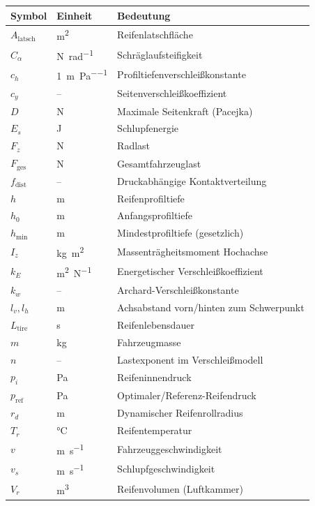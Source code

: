 ﻿\documentclass[12pt,a4paper]{article}
\theoremstyle{definition}
\theoremstyle{remark}
\newcommand{\Fz}{F_z}
\begin{document}
\begin{longtable}{lll}
\toprule
\textbf{Symbol} & \textbf{Einheit} & \textbf{Bedeutung}\\
\midrule
$A_{\mathrm{latsch}}$ & \si{\metre\squared} & Reifenlatschfläche\\
$C_\alpha$ & \si{\newton\per\radian} & Schräglaufsteifigkeit\\
$c_h$ & \si{1\per\metre\per\pascal} & Profiltiefenverschleißkonstante\\
$c_y$ & -- & Seitenverschleißkoeffizient\\
$D$ & \si{\newton} & Maximale Seitenkraft (Pacejka)\\
$E_s$ & \si{\joule} & Schlupfenergie\\
$\Fz$ & \si{\newton} & Radlast\\
$F_{\mathrm{ges}}$ & \si{\newton} & Gesamtfahrzeuglast\\
$f_{\mathrm{dist}}$ & -- & Druckabhängige Kontaktverteilung\\
$h$ & \si{\metre} & Reifenprofiltiefe\\
$h_0$ & \si{\metre} & Anfangsprofiltiefe\\
$h_{\min}$ & \si{\metre} & Mindestprofiltiefe (gesetzlich)\\
$I_z$ & \si{\kilogram\metre\squared} & Massenträgheitsmoment Hochachse\\
$k_E$ & \si{\metre\squared\per\newton} & Energetischer Verschleißkoeffizient\\
$k_w$ & -- & Archard-Verschleißkonstante\\
$l_v, l_h$ & \si{\metre} & Achsabstand vorn/hinten zum Schwerpunkt\\
$L_{\mathrm{tire}}$ & \si{\second} & Reifenlebensdauer\\
$m$ & \si{\kilogram} & Fahrzeugmasse\\
$n$ & -- & Lastexponent im Verschleißmodell\\
$p_i$ & \si{\pascal} & Reifeninnendruck\\
$p_{\mathrm{ref}}$ & \si{\pascal} & Optimaler/Referenz-Reifendruck\\
$r_d$ & \si{\metre} & Dynamischer Reifenrollradius\\
$T_r$ & \si{\celsius} & Reifentemperatur\\
$v$ & \si{\metre\per\second} & Fahrzeuggeschwindigkeit\\
$v_s$ & \si{\metre\per\second} & Schlupfgeschwindigkeit\\
$V_r$ & \si{\metre\cubed} & Reifenvolumen (Luftkammer)\\

\end{longtable}
\end{document}
